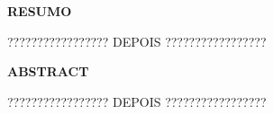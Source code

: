 \documentclass[
  12pt,				%
  openany,
  oneside,
  a4paper,			%
  english,			%
  brazil
]{article}
\numberwithin{figure}{section}
\numberwithin{table}{section}
\begin{document}
\begin{titlepage}

\begin{center}
\textbf{RESUMO}
\end{center}


????????????????? DEPOIS ?????????????????



\end{titlepage}


\begin{titlepage}

\begin{center}
\textbf{ABSTRACT}
\end{center}

????????????????? DEPOIS ?????????????????



\end{titlepage}


%
%
%
\end{document}
